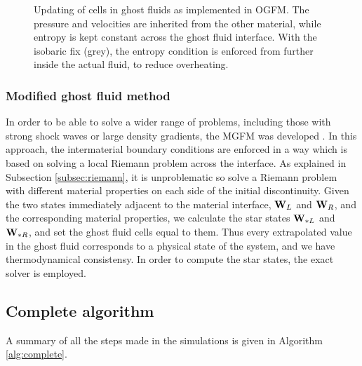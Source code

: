 \documentclass[final,3p,twocolumn]{elsarticle}
\begin{document}
\begin{figure}[htb]
    \caption{Updating of cells in ghost fluids as implemented in OGFM. The
    pressure and velocities are inherited from the other material, while
    entropy is kept constant across the ghost fluid interface. With the
    isobaric fix (grey), the entropy condition is enforced from further inside the
    actual fluid, to reduce overheating.}
    \label{fig:OGFM}
\end{figure}

\subsubsection{Modified ghost fluid method}
\label{subsubsec:mgfm}

In order to be able to solve a wider range of problems, including those with
strong shock waves or large density gradients, the MGFM was developed
\cite{liu2003ghost, sambasivan2009ghost}. In this approach, the intermaterial
boundary conditions are enforced in a way which is based on solving a local
Riemann problem across the interface. As explained in Subsection
\ref{subsec:riemann}, it is unproblematic so solve a Riemann problem with
different material properties on each side of the initial discontinuity. Given
the two states immediately adjacent to the material interface, ${\bf W}_L$ and
${\bf W}_R$, and the corresponding material properties, we calculate the star
states ${\bf W}_{*L}$ and ${\bf W}_{*R}$, and set the ghost fluid cells equal
to them. Thus every extrapolated value in the ghost fluid corresponds to a
physical state of the system, and we have thermodynamical consistensy. In order
to compute the star states, the exact solver is employed. 

\subsection{Complete algorithm}
\label{subsec:complete}

A summary of all the steps made in the simulations is given in Algorithm
\ref{alg:complete}.
\end{document}
